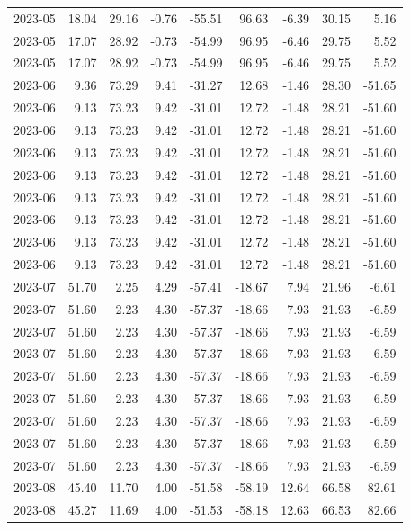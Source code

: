 \begin{table}[ht]
\begin{tabular}{lrrrrrrrr}
  2023-05 & 18.04 & 29.16 & -0.76 & -55.51 & 96.63 & -6.39 & 30.15 & 5.16 \\ 
  2023-05 & 17.07 & 28.92 & -0.73 & -54.99 & 96.95 & -6.46 & 29.75 & 5.52 \\ 
  2023-05 & 17.07 & 28.92 & -0.73 & -54.99 & 96.95 & -6.46 & 29.75 & 5.52 \\ 
  2023-06 & 9.36 & 73.29 & 9.41 & -31.27 & 12.68 & -1.46 & 28.30 & -51.65 \\ 
  2023-06 & 9.13 & 73.23 & 9.42 & -31.01 & 12.72 & -1.48 & 28.21 & -51.60 \\ 
  2023-06 & 9.13 & 73.23 & 9.42 & -31.01 & 12.72 & -1.48 & 28.21 & -51.60 \\ 
  2023-06 & 9.13 & 73.23 & 9.42 & -31.01 & 12.72 & -1.48 & 28.21 & -51.60 \\ 
  2023-06 & 9.13 & 73.23 & 9.42 & -31.01 & 12.72 & -1.48 & 28.21 & -51.60 \\ 
  2023-06 & 9.13 & 73.23 & 9.42 & -31.01 & 12.72 & -1.48 & 28.21 & -51.60 \\ 
  2023-06 & 9.13 & 73.23 & 9.42 & -31.01 & 12.72 & -1.48 & 28.21 & -51.60 \\ 
  2023-06 & 9.13 & 73.23 & 9.42 & -31.01 & 12.72 & -1.48 & 28.21 & -51.60 \\ 
  2023-06 & 9.13 & 73.23 & 9.42 & -31.01 & 12.72 & -1.48 & 28.21 & -51.60 \\ 
  2023-07 & 51.70 & 2.25 & 4.29 & -57.41 & -18.67 & 7.94 & 21.96 & -6.61 \\ 
  2023-07 & 51.60 & 2.23 & 4.30 & -57.37 & -18.66 & 7.93 & 21.93 & -6.59 \\ 
  2023-07 & 51.60 & 2.23 & 4.30 & -57.37 & -18.66 & 7.93 & 21.93 & -6.59 \\ 
  2023-07 & 51.60 & 2.23 & 4.30 & -57.37 & -18.66 & 7.93 & 21.93 & -6.59 \\ 
  2023-07 & 51.60 & 2.23 & 4.30 & -57.37 & -18.66 & 7.93 & 21.93 & -6.59 \\ 
  2023-07 & 51.60 & 2.23 & 4.30 & -57.37 & -18.66 & 7.93 & 21.93 & -6.59 \\ 
  2023-07 & 51.60 & 2.23 & 4.30 & -57.37 & -18.66 & 7.93 & 21.93 & -6.59 \\ 
  2023-07 & 51.60 & 2.23 & 4.30 & -57.37 & -18.66 & 7.93 & 21.93 & -6.59 \\ 
  2023-07 & 51.60 & 2.23 & 4.30 & -57.37 & -18.66 & 7.93 & 21.93 & -6.59 \\ 
  2023-08 & 45.40 & 11.70 & 4.00 & -51.58 & -58.19 & 12.64 & 66.58 & 82.61 \\ 
  2023-08 & 45.27 & 11.69 & 4.00 & -51.53 & -58.18 & 12.63 & 66.53 & 82.66 \\ 

\end{tabular}
\end{table}

